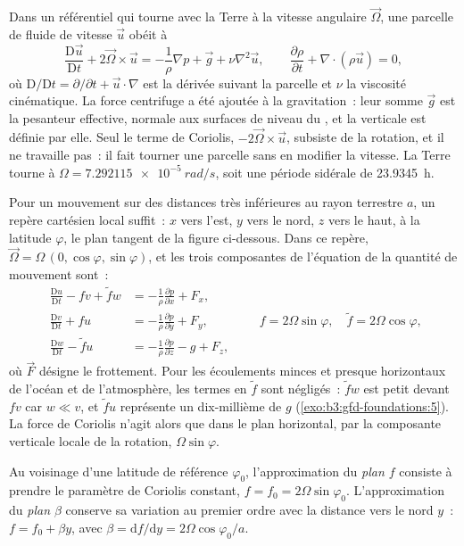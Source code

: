 Dans un référentiel qui tourne avec la Terre à la vitesse angulaire
$\vec\Omega$, une parcelle de fluide de vitesse $\vec u$ obéit à
\[
\frac{\mathrm D\vec u}{\mathrm Dt} + 2\vec\Omega\times\vec u =
-\frac{1}{\rho}\nabla p + \vec g + \nu\nabla^2\vec u ,
\qquad
\frac{\partial\rho}{\partial t} + \nabla\cdot(\rho\vec u) = 0 ,
\]
où $\mathrm D/\mathrm Dt = \partial/\partial t + \vec u\cdot\nabla$ est
la dérivée suivant la parcelle et $\nu$ la viscosité cinématique. La
force centrifuge a été ajoutée à la gravitation~: leur somme $\vec g$ est la
pesanteur effective, normale aux surfaces de niveau du , et
la verticale est définie par elle. Seul le terme de Coriolis, $-2\vec\Omega\times
\vec u$, subsiste de la rotation, et il ne travaille pas~: il fait tourner une parcelle
sans en modifier la vitesse. La Terre tourne à $\Omega =
\qty{7.292115e-5}{rad/s}$, soit une période sidérale de \qty{23.9345}{h}.

Pour un mouvement sur des distances très inférieures au rayon terrestre $a$, un
repère cartésien local suffit~: $x$ vers l'est, $y$ vers le nord, $z$ vers le haut,
à la latitude $\varphi$, le plan tangent de la figure ci-dessous. Dans
ce repère, $\vec\Omega = \Omega\,(0, \cos\varphi, \sin\varphi)$, et les trois
composantes de l'équation de la quantité de mouvement sont~:
\[
\begin{aligned}
\frac{\mathrm Du}{\mathrm Dt} - f v + \tilde f w &= -\frac{1}{\rho}\frac{\partial p}{\partial x} + F_x ,\\
\frac{\mathrm Dv}{\mathrm Dt} + f u &= -\frac{1}{\rho}\frac{\partial p}{\partial y} + F_y ,\\
\frac{\mathrm Dw}{\mathrm Dt} - \tilde f u &= -\frac{1}{\rho}\frac{\partial p}{\partial z} - g + F_z ,
\end{aligned}
\qquad f = 2\Omega\sin\varphi,\quad \tilde f = 2\Omega\cos\varphi ,
\]
où $\vec F$ désigne le frottement. Pour les écoulements minces et presque horizontaux
de l'océan et de l'atmosphère, les termes en $\tilde f$ sont négligés~: $\tilde f w$
est petit devant $fv$ car $w \ll v$, et $\tilde f u$ représente un dix-millième
de $g$ (\cref{exo:b3:gfd-foundations:5}). La force de Coriolis n'agit alors que
dans le plan horizontal, par la composante verticale locale de la rotation,
$\Omega\sin\varphi$.

\begin{definition}\label{def:b3:gfd-foundations:planes}
Au voisinage d'une latitude de référence $\varphi_0$, l'approximation du \emph{plan $f$}
consiste à prendre le paramètre de Coriolis constant, $f = f_0 =
2\Omega\sin\varphi_0$. L'approximation du \emph{plan $\beta$}
conserve sa variation au premier ordre avec la distance vers le nord $y$~:
$f = f_0 + \beta y$, avec $\beta = \mathrm df/\mathrm dy = 2\Omega
\cos\varphi_0/a$.
\end{definition}

